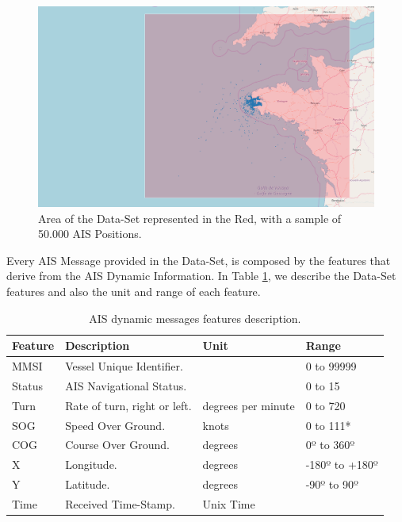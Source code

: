 \begin{figure}[H]
	\centering
	\includegraphics[scale = .23]{figures/Ch4/nari_DS_ex2.png}
    \caption{Area of the Data-Set represented in the Red, with a sample of 50.000 AIS Positions.}
    \label{fig:DS_Sample}
\end{figure}

Every AIS Message provided in the Data-Set, is composed by the features that derive from the AIS Dynamic Information. In Table \ref{Table: Data-Set Features}, we describe the Data-Set features and also the unit and range of each feature. 

\begin{table}[H]
\centering
\caption{AIS dynamic messages features description.}
\label{Table: Data-Set Features}
\begin{tabular}{@{}llll@{}}
\toprule
Feature & Description                  & Unit               & Range          \\ \midrule
MMSI    & Vessel Unique Identifier.     &                    & 0 to 99999     \\
Status  & AIS Navigational Status.     &                    & 0 to 15        \\
Turn    & Rate of turn, right or left. & degrees per minute & 0 to 720       \\
SOG     & Speed Over Ground.           & knots              & 0 to 111*      \\
COG     & Course Over Ground.          & degrees            & 0º to 360º     \\
X       & Longitude.                   & degrees            & -180º to +180º \\
Y       & Latitude.                    & degrees            & -90º to 90º    \\
Time    & Received Time-Stamp.         & Unix Time          &                \\ \bottomrule
\end{tabular}
\end{table}

